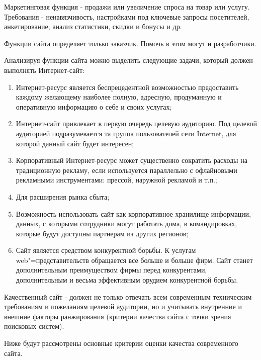 Маркетинговая функция - продажи или увеличение спроса на товар или услугу.
Требования - ненавязчивость, настройками под ключевые запросы посетителей, анкетирование, анализ статистики, скидки и бонусы и др.

Функции сайта определяет только заказчик. Помочь в этом могут и разработчики.

Анализируя функции сайта можно выделить следующие задачи, который должен выполнять Интернет-сайт:
\begin{enumerate}
  \item Интернет-ресурс является беспрецедентной возможностью предоставить каждому желающему наиболее полную, адресную, продуманную и оперативную информацию о себе и своих услугах;
  \item Интернет-сайт привлекает в первую очередь целевую аудиторию. Под целевой аудиторией подразумевается та группа пользователей сети Internet, для которой данный сайт будет интересен;
  \item Корпоративный Интернет-ресурс может существенно сократить расходы на традиционную рекламу, если используется параллельно с офлайновыми рекламными инструментами: прессой, наружной рекламой и т.п.;
  \item Для расширения рынка сбыта;
  \item Возможность использовать сайт как корпоративное хранилище информации, данных, с которыми сотрудники могут работать дома, в командировках, которые будут доступны партнерам из других регионов;
  \item Сайт является средством конкурентной борьбы.
  К услугам web"=представительств обращается все больше и больше фирм.
  Сайт станет дополнительным преимуществом фирмы перед конкурентами, дополнительным и весьма эффективным орудием конкурентной борьбы.
\end{enumerate}

Качественный сайт - должен не только отвечать всем современным техническим требованиям и пожеланиям целевой аудитории, но и учитывать внутренние и внешние факторы ранжирования (критерии качества сайта с точки зрения поисковых систем).

Ниже будут рассмотрены основные критерии оценки качества современного сайта.

